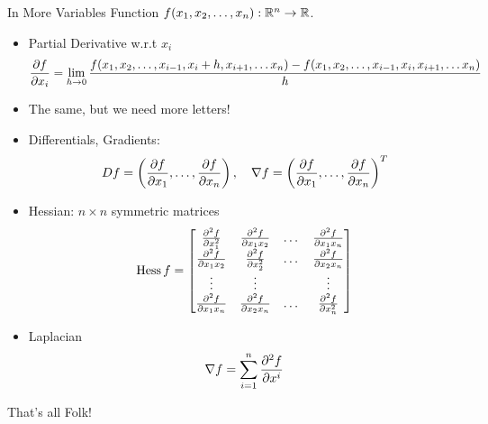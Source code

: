 \documentclass[8pt,dvipsnames]{beamer}
\begin{document}
\begin{frame}{In More Variables}
Function $f(x_1,x_2,\dots,x_n):{\mathbb R}^n\to {\mathbb R}$.
\begin{itemize}
\item Partial Derivative w.r.t $x_i$
$$
\frac{\partial{f}}{\partial{x_i}} = \lim_{h\to 0}\frac{f(x_1,x_2,\dots,x_{i-1},x_i+h,x_{i+1},\dots x_n) - f(x_1,x_2,\dots,x_{i-1},x_i,x_{i+1},\dots x_n)}{h}
$$
\item The same, but we need more letters!
\item Differentials, Gradients:
  $$
  Df = \left(\frac{\partial{f}}{\partial{x_1}},\dots,\frac{\partial{f}}{\partial{x_n}}\right),\quad \nabla f = \left(\frac{\partial{f}}{\partial{x_1}},\dots,\frac{\partial{f}}{\partial{x_n}}\right)^T
  $$
  \item Hessian: $n\times n$ symmetric matrices
  $$
  \operatorname{Hess} f = 
   \begin{bmatrix}
     \frac{\partial^{2}{f}}{\partial{x_1^2}} & \frac{\partial^{2}{f}}{\partial{x_1x_2}} & \dots & \frac{\partial^{2}{f}}{\partial{x_1x_n}}\\
     \frac{\partial^{2}{f}}{\partial{x_1x_2}} & \frac{\partial^{2}{f}}{\partial{x_2^2}} & \dots & \frac{\partial^{2}{f}}{\partial{x_2x_n}}\\
     \vdots & \vdots & & \vdots\\
     \frac{\partial^{2}{f}}{\partial{x_1x_n}} & \frac{\partial^{2}{f}}{\partial{x_2x_n}} & \dots & \frac{\partial^{2}{f}}{\partial{x_n^2}}
   \end{bmatrix}
  $$
  \item Laplacian
    $$
    \nabla f = \sum_{i=1}^n \frac{\partial^{2}{f}}{\partial{x^i}}
    $$
\end{itemize}  
\end{frame}



\begin{frame}
\vfill
\begin{center}
  \Huge That's all Folk!
\end{center}
\vfill  
\end{frame}
\end{document}
